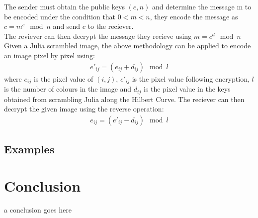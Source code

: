 \documentclass[12pt]{article}
\begin{document}
{The sender must obtain the public keys $(e,n)$ and determine the message m to be encoded under the condition that $0 < m < n$, they encode the message as $c = m^{c} \mod n$ and send $c$ to the reciever.\\

The reviever can then decrypt the message they recieve using $m = c^{d} \mod n$ \\


Given a Julia scrambled image, the above methodology can be applied to encode an image pixel by pixel using:
\begin{align*}
e'_{ij} = (e_{ij} + d_{ij})\mod  l
\end{align*}
where $e_{ij}$ is the pixel value of $(i,j)$, $e'_{ij}$ is the pixel value following encryption, $l$ is the number of colours in the image and $d_{ij}$  is the pixel value in the keys obtained from scrambling Julia along the Hilbert Curve. \cite{algo} The reciever can then decrypt the given image using the reverse operation:
\begin{align*}
e_{ij} = (e'_{ij} - d_{ij})\mod l
\end{align*}

}
\subsection{Examples}


\section{Conclusion}
a conclusion goes here



\end{document}
